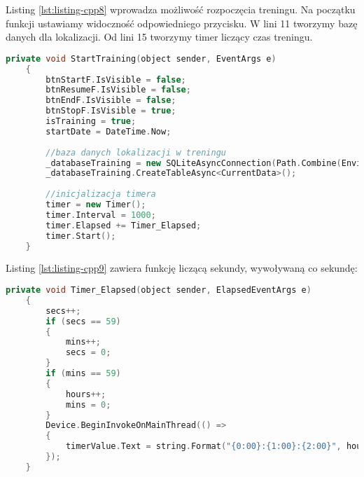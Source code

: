 Listing \ref{lst:listing-cpp8} wprowadza możliwość rozpoczęcia treningu. Na początku funkcji ustawiamy widoczność odpowiedniego przycisku. W lini 11 tworzymy bazę danych dla lokalizacji. Od lini 15 tworzymy timer liczący czas treningu.
\begin{lstlisting}[caption=Rozpoczęcie treningu, label={lst:listing-cpp8}, language=C++]
	private void StartTraining(object sender, EventArgs e)
	{
		btnStartF.IsVisible = false;
		btnResumeF.IsVisible = false;
		btnEndF.IsVisible = false;
		btnStopF.IsVisible = true;
		isTraining = true;
		startDate = DateTime.Now;
		
		//baza danych lokalizacji w treningu
		_databaseTraining = new SQLiteAsyncConnection(Path.Combine(Environment.GetFolderPath(Environment.SpecialFolder.LocalApplicationData), "training" + startDate.ToString("dd_MM_yyyy_HH_mm_ss") + ".db3"));
		_databaseTraining.CreateTableAsync<CurrentData>();
		
		//inicjalizacja timera
		timer = new Timer();
		timer.Interval = 1000;
		timer.Elapsed += Timer_Elapsed;
		timer.Start();
	}
\end{lstlisting}

Listing \ref{lst:listing-cpp9} zawiera funkcję liczącą sekundy, wywoływaną co sekundę:
\begin{lstlisting}[caption=Liczenie sekund (co sekundę:), label={lst:listing-cpp9}, language=C++]
	private void Timer_Elapsed(object sender, ElapsedEventArgs e)
	{
		secs++;
		if (secs == 59)
		{
			mins++;
			secs = 0;
		}
		if (mins == 59)
		{
			hours++;
			mins = 0;
		}
		Device.BeginInvokeOnMainThread(() =>
		{
			timerValue.Text = string.Format("{0:00}:{1:00}:{2:00}", hours, mins, secs);
		});
	}
\end{lstlisting}

